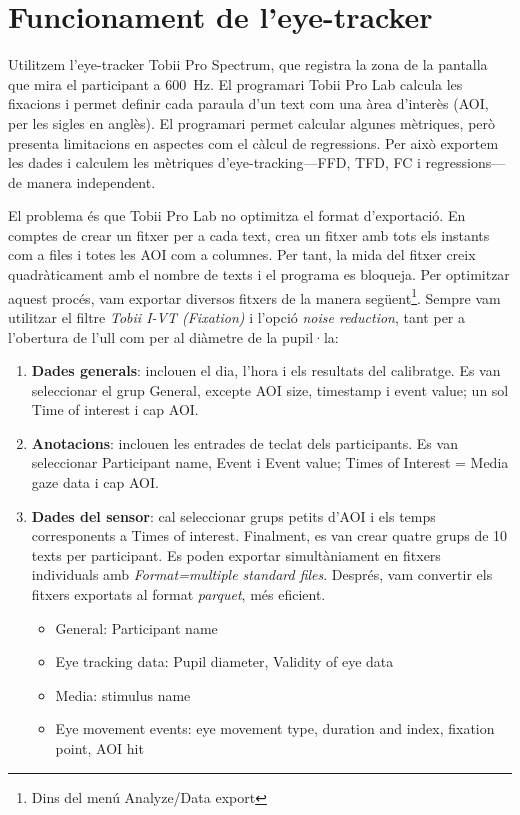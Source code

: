 \hypersetup{bookmarksdepth=0}
\chapter{Funcionament de l'eye-tracker}\label{sec:tobii}

Utilitzem l'eye-tracker Tobii Pro Spectrum, que registra la zona de la pantalla que mira el participant a 600~Hz.
El programari Tobii Pro Lab calcula les fixacions i permet definir cada paraula d'un text com una àrea d'interès (AOI, per les sigles en anglès).
El programari permet calcular algunes mètriques, però presenta limitacions en aspectes com el càlcul de regressions.
Per això exportem les dades i calculem les mètriques d'eye-tracking---FFD, TFD, FC i regressions---de manera independent.

El problema és que Tobii Pro Lab no optimitza el format d'exportació.
En comptes de crear un fitxer per a cada text, crea un fitxer amb tots els instants com a files i totes les AOI com a columnes.
Per tant, la mida del fitxer creix quadràticament amb el nombre de texts i el programa es bloqueja.
Per optimitzar aquest procés, vam exportar diversos fitxers de la manera següent\footnote{Dins del menú Analyze/Data export}. Sempre vam utilitzar el filtre \textit{Tobii I-VT (Fixation)} i l'opció \textit{noise reduction}, tant per a l'obertura de l'ull com per al diàmetre de la pupil·la:

\begin{enumerate}
    \item \textbf{Dades generals}: inclouen el dia, l'hora i els resultats del calibratge. Es van seleccionar el grup General, excepte AOI size, timestamp i event value; un sol Time of interest i cap AOI.
    \item \textbf{Anotacions}: inclouen les entrades de teclat dels participants. Es van seleccionar Participant name, Event i Event value; Times of Interest = Media gaze data i cap AOI.
    \item \textbf{Dades del sensor}: cal seleccionar grups petits d'AOI i els temps corresponents a Times of interest. Finalment, es van crear quatre grups de 10 texts per participant. Es poden exportar simultàniament en fitxers individuals amb \textit{Format=multiple standard files}. Després, vam convertir els fitxers exportats al format \textit{parquet}, més eficient.
        \begin{itemize}
            \item General: Participant name
            \item Eye tracking data: Pupil diameter, Validity of eye data
            \item Media: stimulus name
            \item Eye movement events: eye movement type, duration and index, fixation point, AOI hit
        \end{itemize}
\end{enumerate}


